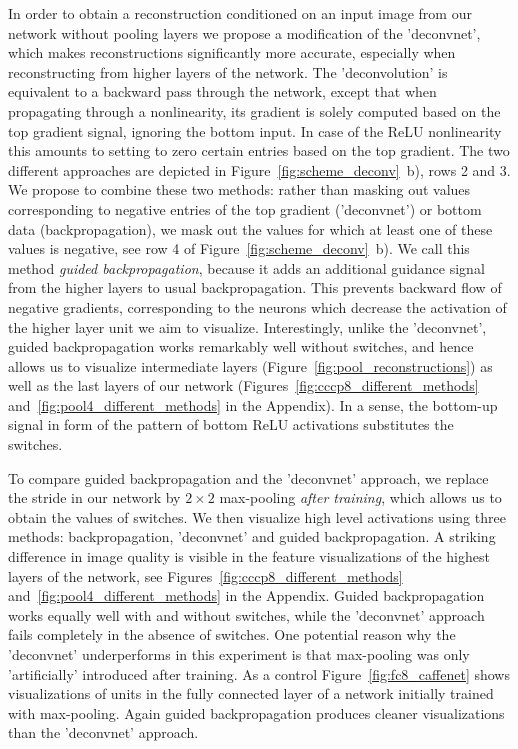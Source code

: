 \documentclass{article} \usepackage{iclr2015,times}
\begin{document}
In order to obtain a reconstruction conditioned on an input image from our network without pooling layers we propose a modification of the 'deconvnet', which makes reconstructions significantly more accurate, especially when reconstructing from higher layers of the network. The 'deconvolution' is equivalent to a backward pass through the network, except that when propagating through a nonlinearity, its gradient is solely computed based on the top gradient signal, ignoring the bottom input. In case of the ReLU nonlinearity this amounts to setting to zero certain entries based on the top gradient. The two different approaches are depicted in Figure~\ref{fig:scheme_deconv}~b), rows 2 and 3. We propose to combine these two methods: rather than masking out values corresponding to negative entries of the top gradient ('deconvnet') or bottom data (backpropagation), we mask out the values for which at least one of these values is negative, see row 4 of Figure~\ref{fig:scheme_deconv}~b). We call this method \emph{guided backpropagation}, because it adds an additional guidance signal from the higher layers to usual backpropagation. This prevents backward flow of negative gradients, corresponding to the neurons which decrease the activation of the higher layer unit we aim to visualize. Interestingly, unlike the 'deconvnet', guided backpropagation works remarkably well without switches, and hence allows us to visualize intermediate layers (Figure~\ref{fig:pool_reconstructions}) as well as the last layers of our network (Figures~\ref{fig:cccp8_different_methods} and~\ref{fig:pool4_different_methods} in the Appendix). In a sense, the bottom-up signal in form of the pattern of bottom ReLU activations substitutes the switches. 

To compare guided backpropagation and the 'deconvnet' approach, we replace the stride in our network by $2\times 2$ max-pooling \emph{after training}, which allows us to obtain the values of switches. We then visualize high level activations using three methods: backpropagation, 'deconvnet' and guided backpropagation. A striking difference in image quality is visible in the feature visualizations of the highest layers of the network, see Figures~\ref{fig:cccp8_different_methods} and~\ref{fig:pool4_different_methods} in the Appendix. Guided backpropagation works equally well with and without switches, while the 'deconvnet' approach fails completely in the absence of switches. One potential reason why the 'deconvnet' underperforms in this experiment is that max-pooling was only 'artificially' introduced after training. As a control Figure~\ref{fig:fc8_caffenet} shows visualizations of units in the fully connected layer of a network initially trained with max-pooling. Again guided backpropagation produces cleaner visualizations than the 'deconvnet' approach.
\end{document}
